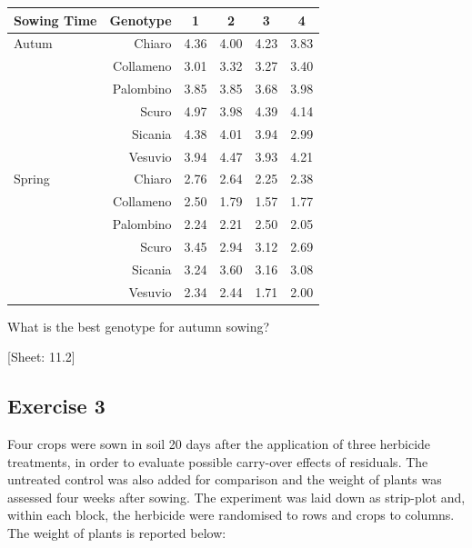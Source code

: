 \documentclass[a4paper,12pt,oneside]{book}
\begin{document}
\begin{longtable}[]{@{}lrcccc@{}}
\toprule()
Sowing Time & Genotype & 1 & 2 & 3 & 4 \\
\midrule()
\endhead
Autum & Chiaro & 4.36 & 4.00 & 4.23 & 3.83 \\
& Collameno & 3.01 & 3.32 & 3.27 & 3.40 \\
& Palombino & 3.85 & 3.85 & 3.68 & 3.98 \\
& Scuro & 4.97 & 3.98 & 4.39 & 4.14 \\
& Sicania & 4.38 & 4.01 & 3.94 & 2.99 \\
& Vesuvio & 3.94 & 4.47 & 3.93 & 4.21 \\
Spring & Chiaro & 2.76 & 2.64 & 2.25 & 2.38 \\
& Collameno & 2.50 & 1.79 & 1.57 & 1.77 \\
& Palombino & 2.24 & 2.21 & 2.50 & 2.05 \\
& Scuro & 3.45 & 2.94 & 3.12 & 2.69 \\
& Sicania & 3.24 & 3.60 & 3.16 & 3.08 \\
& Vesuvio & 2.34 & 2.44 & 1.71 & 2.00 \\
\bottomrule()
\end{longtable}

What is the best genotype for autumn sowing?

{[}Sheet: 11.2{]}

\hypertarget{exercise-3-7}{%
\subsection{Exercise 3}\label{exercise-3-7}}

Four crops were sown in soil 20 days after the application of three herbicide treatments, in order to evaluate possible carry-over effects of residuals. The untreated control was also added for comparison and the weight of plants was assessed four weeks after sowing. The experiment was laid down as strip-plot and, within each block, the herbicide were randomised to rows and crops to columns. The weight of plants is reported below:
\end{document}
